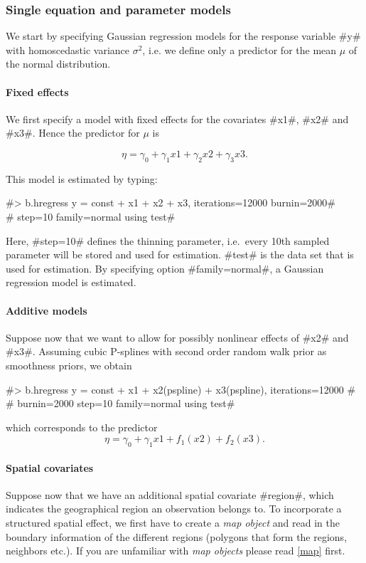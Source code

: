\subsubsection{Single equation and parameter models}

We start by specifying Gaussian regression models for the response variable #y#
with homoscedastic variance $\sigma^2$, i.e. we define only a predictor for the mean
$\mu$ of the normal distribution.

\paragraph{Fixed effects}
$$$$
We first specify a model with
fixed effects for the covariates #x1#, #x2# and #x3#. Hence the
predictor for $\mu$ is

$$
\eta = \gamma_0 + \gamma_1 x1 + \gamma_2 x2 + \gamma_3 x3.
$$

This model is estimated by typing:

#> b.hregress y = const + x1 + x2 + x3, iterations=12000 burnin=2000# \\
#  step=10 family=normal using test#

Here, #step=10# defines the thinning parameter, i.e.~every
10th sampled parameter will be stored and used for estimation.
#test# is the data set that is used for estimation. By specifying
option #family=normal#, a Gaussian regression model is estimated.

\paragraph{Additive models}
$$$$
Suppose now that we want to allow for possibly nonlinear effects
of #x2# and #x3#. Assuming cubic P-splines with second order
random walk prior as smoothness priors, we obtain

#> b.hregress y = const + x1 + x2(pspline) + x3(pspline), iterations=12000 #\\
#  burnin=2000 step=10 family=normal using test#

which corresponds to the predictor
$$
\eta = \gamma_0 + \gamma_1 x1 + f_1(x2) + f_2(x3).
$$


\paragraph{Spatial covariates}
$$$$
Suppose now that we have an additional spatial covariate #region#,
which indicates the geographical region an observation belongs to.
To incorporate a structured spatial effect, we first have to
create a {\em map object} and read in the boundary information of
the different regions (polygons that form the regions, neighbors
etc.). If you are unfamiliar with {\em map objects} please read
\autoref{map} first.

